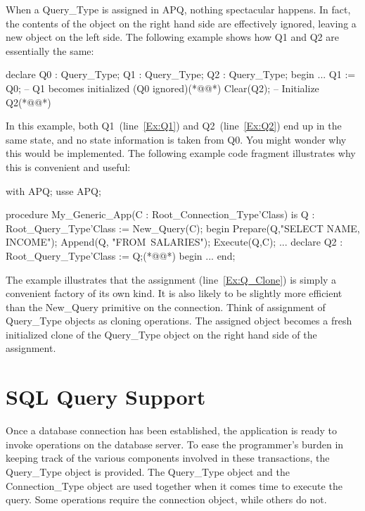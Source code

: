 \documentclass[english,letterpaper]{book}
\begin{document}
When a Query\_Type is assigned in APQ, nothing spectacular happens.
In fact, the contents of the object on the right hand side are effectively
ignored, leaving a new object on the left side. The following example
shows how Q1 and Q2 are essentially the same:

\begin{NumberedExample}
declare
   Q0 : Query_Type;
   Q1 : Query_Type;
   Q2 : Query_Type;
begin
   ...
   Q1 := Q0;   -- Q1 becomes initialized (Q0 ignored)(*@\label{Ex:Q1}@*)
   Clear(Q2);  -- Initialize Q2(*@\label{Ex:Q2}@*)
\end{NumberedExample}

In this example, both Q1~(line~\ref{Ex:Q1}) and Q2~(line~\ref{Ex:Q2})
end up in the same state, and no state information is taken from Q0. You
might wonder why this would be implemented. The following example code
fragment illustrates why this is convenient and useful:

\begin{NumberedExample}
with APQ;
usse APQ;

procedure My_Generic_App(C : Root_Connection_Type'Class) is
   Q : Root_Query_Type'Class := New_Query(C);
begin
   Prepare(Q,"SELECT NAME, INCOME");
   Append(Q, "FROM~SALARIES");
   Execute(Q,C);
   ...
   declare
      Q2 : Root_Query_Type'Class := Q;(*@\label{Ex:Q_Clone}@*)
   begin
      ...
   end;
\end{NumberedExample}

The example illustrates that the assignment (line~\ref{Ex:Q_Clone}) is
simply a convenient factory of its own kind. It is also likely to be
slightly more efficient than the New\_Query primitive on the
connection. Think of assignment of Query\_Type objects as cloning
operations. The assigned object becomes a fresh initialized clone of the
Query\_Type object on the right hand side of the assignment.

\chapter{SQL Query Support}

Once a database connection has been established, the application is
ready to invoke operations on the database server. To ease the programmer's
burden in keeping track of the various components involved in these
transactions, the Query\_Type object is provided. The Query\_Type
object and the Connection\_Type object are used together when it comes
time to execute the query. Some operations require the connection
object, while others do not.
\end{document}
